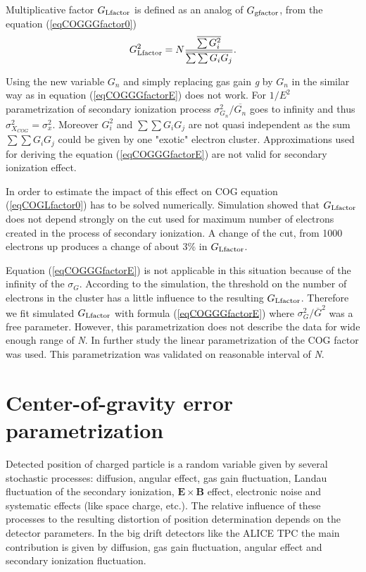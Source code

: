 \documentclass[a4paper,12pt]{article}
\begin{document}
Multiplicative factor $G_{\rm{Lfactor}}$ is defined as an analog
of $G_{\rm{gfactor}}$, from the equation (\ref{eqCOGGGfactor0})
\begin{eqnarray}
    G_{\rm{Lfactor}}^2 =  N\frac{\overline{\sum{G_i^2}}}
    {\overline{\sum\sum{G_iG_j}}}.
\label{eqCOGLfactor0}
\end{eqnarray}

Using the new variable $G_n$ and simply replacing  gas gain
{\it{g}} by $G_n$ in the similar way as in equation
(\ref{eqCOGGGfactorE}) does not work. For $1/E^{2}$
parametrization of secondary ionization process
$\sigma^2_{G_n}/\overline{G_n}$ goes to infinity and thus
$\sigma^2_{X_{COG}}=\sigma_x^2$. Moreover $G_i^2$ and
$\sum\sum{G_iG_j}$ are not quasi independent as the sum
$\sum\sum{G_iG_j}$ could be given by one "exotic" electron
cluster. Approximations used for deriving the equation
(\ref{eqCOGGGfactorE}) are not valid for secondary ionization
effect.

In order to estimate the impact of this effect on COG  equation
(\ref{eqCOGLfactor0}) has to be solved numerically. Simulation
showed that $G_{\rm{Lfactor}}$ does not depend strongly on the cut
used for maximum number of electrons created in the process of
secondary ionization. A change of the cut,  from 1000 electrons up
produces a change of about 3\% in $G_{\rm{Lfactor}}$.

Equation (\ref{eqCOGGGfactorE}) is not applicable in this
situation because of the infinity of the $\sigma_G$. According to
the simulation, the threshold  on the number of electrons in the
cluster  has a little influence to the resulting
$G_{\rm{Lfactor}}$. Therefore we fit simulated $G_{\rm{Lfactor}}$
with formula (\ref{eqCOGGGfactorE}) where
$\sigma_G^2/\overline{G}^2$ was a free parameter. However, this
parametrization does not describe the data for wide enough range
of {\it{N}}. In further study the linear parametrization of the
COG factor was used. This parametrization was validated on
reasonable interval of {\it{N}}.



\section{Center-of-gravity error parametrization}

Detected position of charged particle  is a random variable given
by several stochastic processes: diffusion, angular effect, gas
gain fluctuation, Landau fluctuation of the secondary ionization,
$\mathbf{E{\times}B}$ effect, electronic noise and systematic
effects (like space charge, etc.). The relative influence of these
processes to the resulting distortion of position determination
depends on the detector parameters. In the big drift detectors
like the ALICE TPC the main contribution is given by diffusion,
gas gain fluctuation, angular effect and secondary ionization
fluctuation.
\end{document}
